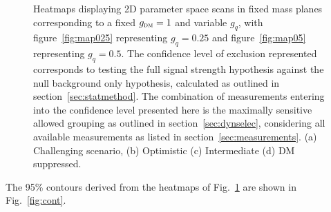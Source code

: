 \documentclass[floatfix]{article}
\begin{document}
\begin{figure}[p]
    \caption{Heatmaps displaying 2D parameter space scans in fixed mass planes corresponding to a fixed $g_{\textsc{dm}} = 1$ and variable $g_{q}$, with
    figure~\ref{fig:map025} representing $g_{q}=0.25$ and figure~\ref{fig:map05} representing $g_{q}=0.5$. The confidence level of exclusion represented 
    corresponds to testing the full signal strength hypothesis against the null background only hypothesis, calculated as outlined in 
    section~\ref{sec:statmethod}. The combination of measurements entering into the confidence level presented here is the maximally
    sensitive allowed grouping as outlined in section~\ref{sec:dynselec}, considering all available measurements as listed in section~\ref{sec:measurements}.
    (a) Challenging scenario, (b) Optimistic (c) Intermediate (d) DM suppressed.}

    \label{fig:maps}
\end{figure}

The 95\% contours derived from the heatmaps of Fig.~\ref{fig:maps} are shown in Fig.~\ref{fig:cont}.
\end{document}
